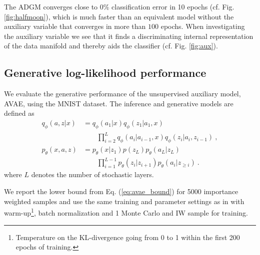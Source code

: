 \documentclass{article}
\begin{document}
The ADGM converges close to $0\%$ classification error in 10 epochs (cf. Fig. \ref{fig:halfmoon}), which is much faster than an equivalent model without the auxiliary variable that converges in more than $100$ epochs. When investigating the auxiliary variable we see that it finds a discriminating internal representation of the data manifold and thereby aids the classifier (cf. Fig. \ref{fig:aux}).

\subsection{Generative log-likelihood performance}\label{sec:loglikelihood}
We evaluate the generative performance of the unsupervised auxiliary model, AVAE, using the MNIST dataset. The inference and generative models are defined as
\begin{align}
q_{\phi}(a,z|x)&=q_{\phi}(a_1|x)q_{\phi}(z_1|a_1,x) \\
&\quad\quad\prod_{i=2}^{L} q_\phi(a_i|a_{i-1},x) q_\phi(z_i|a_i,z_{i-1})\ , \nonumber \\
p_\theta(x,a,z)&=p_\theta(x|z_1)p(z_L)p_\theta(a_L|z_L)\\
&\quad\quad\prod_{i=1}^{L-1}p_\theta(z_i|z_{i+1})p_\theta(a_i|z_{\geq i}) \ . \nonumber
\end{align}
where $L$ denotes the number of stochastic layers. 

We report the lower bound from Eq. (\ref{eq:avae_bound}) for 5000 importance weighted samples and use the same training and parameter settings as in \citet{Sonderby2016} with warm-up\footnote{Temperature on the KL-divergence going from 0 to 1 within the first 200 epochs of training.}, batch normalization and 1 Monte Carlo and IW sample for training.
\end{document}
